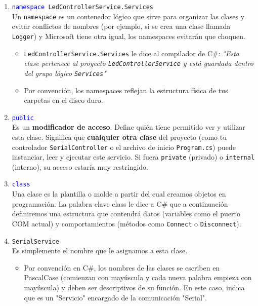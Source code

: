 \documentclass[
10pt, %
a4paper, %
oneside, %
headinclude,footinclude, %
BCOR5mm, %
]{scrartcl}
\begin{document}
\begin{enumerate}
	\item \texttt{\textcolor{blue}{namespace} \textcolor{Emerald}{LedControllerService.Services}} \\
	Un \texttt{namespace} es un contenedor lógico que sirve para organizar las clases y evitar conflictos de nombres (por ejemplo, si se crea una clase llamada \texttt{Logger}) y Microsoft tiene otra igual, los namespaces evitarán que choquen.
	\begin{itemize}
		\item \texttt{LedControllerService.Services} le dice al compilador de C\#: \textit{"Esta clase pertenece al proyecto \texttt{LedControllerService} y está guardada dentro del grupo lógico \texttt{Services}"}
		\item Por convención, los namespaces reflejan la estructura física de tus carpetas en el disco duro.
	\end{itemize}
	\item \texttt{\textcolor{blue}{public}}\\
	Es un \textbf{modificador de acceso}. Define quién tiene permitido ver y utilizar esta clase. Significa que \textbf{cualquier otra clase} del proyecto (como tu controlador \texttt{SerialController} o el archivo de inicio \texttt{Program.cs}) puede instanciar, leer y ejecutar este servicio. Si fuera \texttt{private} (privado) o \texttt{internal} (interno), su acceso estaría muy restringido.
	\item \texttt{\textcolor{blue}{class}}\\
	Una clase es la plantilla o molde a partir del cual creamos objetos en programación. La palabra clave class le dice a C\# que a continuación definiremos una estructura que contendrá datos (variables como el puerto COM actual) y comportamientos (métodos como \texttt{Connect} o \texttt{Disconnect}).
	\item \texttt{\textcolor{Emerald}{SerialService}}\\
	Es simplemente el nombre que le asignamos a esta clase.
	\begin{itemize}
		\item Por convención en C\#, los nombres de las clases se escriben en PascalCase (comienzan con mayúscula y cada nueva palabra empieza con mayúscula) y deben ser descriptivos de su función. En este caso, indica que es un "Servicio" encargado de la comunicación "Serial".
	\end{itemize}
\end{enumerate}
\end{document}
